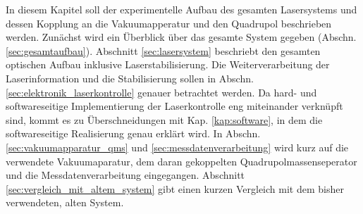 In diesem Kapitel soll der experimentelle Aufbau des gesamten Lasersystems und
dessen Kopplung an die Vakuumapperatur und den Quadrupol beschrieben werden.
Zunächst wird ein Überblick über das gesamte System gegeben (Abschn.
\ref{sec:gesamtaufbau}). Abschnitt \ref{sec:lasersystem} beschriebt den gesamten
optischen Aufbau inklusive Laserstabilisierung. Die Weiterverarbeitung der
Laserinformation und die Stabilisierung sollen in Abschn.
\ref{sec:elektronik_laserkontrolle} genauer betrachtet werden. Da
hard- und softwareseitige Implementierung der Laserkontrolle eng miteinander verknüpft
sind, kommt es zu Überschneidungen mit Kap. \ref{kap:software}, in dem die
softwareseitige Realisierung genau erklärt wird. In Abschn.
\ref{sec:vakuumapparatur_qms} und \ref{sec:messdatenverarbeitung} wird kurz
auf die verwendete Vakuumaparatur, dem daran gekoppelten
Quadrupolmassenseperator und die Messdatenverarbeitung eingegangen.
Abschnitt \ref{sec:vergleich_mit_altem_system} gibt einen kurzen Vergleich mit dem
bisher verwendeten, alten System.

